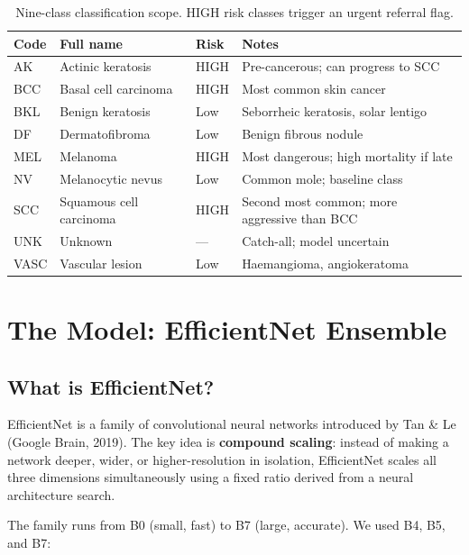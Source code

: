 \documentclass[12pt,a4paper]{article}
\begin{document}
\begin{table}[h]
\centering
\begin{tabular}{llll}
\toprule
\textbf{Code} & \textbf{Full name} & \textbf{Risk} & \textbf{Notes} \\
\midrule
AK   & Actinic keratosis       & HIGH & Pre-cancerous; can progress to SCC \\
BCC  & Basal cell carcinoma    & HIGH & Most common skin cancer \\
BKL  & Benign keratosis        & Low  & Seborrheic keratosis, solar lentigo \\
DF   & Dermatofibroma          & Low  & Benign fibrous nodule \\
MEL  & Melanoma                & HIGH & Most dangerous; high mortality if late \\
NV   & Melanocytic nevus       & Low  & Common mole; baseline class \\
SCC  & Squamous cell carcinoma & HIGH & Second most common; more aggressive than BCC \\
UNK  & Unknown                 & ---  & Catch-all; model uncertain \\
VASC & Vascular lesion         & Low  & Haemangioma, angiokeratoma \\
\bottomrule
\end{tabular}
\caption{Nine-class classification scope. HIGH risk classes trigger an urgent referral flag.}
\end{table}

\section{The Model: EfficientNet Ensemble}

\subsection{What is EfficientNet?}

EfficientNet is a family of convolutional neural networks introduced by Tan \& Le (Google Brain,
2019). The key idea is \textbf{compound scaling}: instead of making a network deeper, wider, or
higher-resolution in isolation, EfficientNet scales all three dimensions simultaneously using a
fixed ratio derived from a neural architecture search.

The family runs from B0 (small, fast) to B7 (large, accurate). We used B4, B5, and B7:
\end{document}
